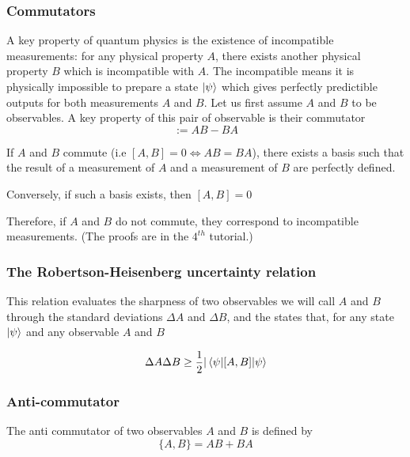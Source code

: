 \documentclass{article}
\begin{document}
\subsubsection*{Commutators}
A key property of quantum physics is the existence of incompatible measurements:
for any physical property $A$, there exists another physical property $B$ which is incompatible
with $A$. The incompatible means it is physically impossible to prepare a state $\ket{\psi}$
which gives perfectly predictible outputs for both measurements $A$ and $B$.
Let us first assume $A$ and $B$ to be observables.
A key property of this pair of observable is their commutator
\begin{equation}
    [A,B]:= AB-BA
\end{equation}

If $A$ and $B$ commute (i.e $[A,B]=0 \Leftrightarrow AB = BA$), there exists a basis
such that the result of a measurement of $A$ and a measurement of $B$ are perfectly defined.

Conversely, if such a basis exists, then $[A,B]=0$

Therefore, if $A$ and $B$ do not commute, they correspond to incompatible measurements.
(The proofs are in the $4^{th}$ tutorial.)

\subsubsection*{The Robertson-Heisenberg uncertainty relation}
This relation evaluates the sharpness of two observables we will call $A$ and $B$ through
the standard deviations $\Delta A$ and $\Delta B$, and the states that, for any state $\ket{\psi}$
and any observable $A$ and $B$

\begin{equation}
    \Delta A \Delta B \geq \frac{1}{2}|\braket{\psi|[A,B]|\psi}
\end{equation}

\subsubsection*{Anti-commutator}
The anti commutator of two observables $A$ and $B$ is defined by
\begin{equation}
    \{A,B\} = AB+BA
\end{equation}
\end{document}
